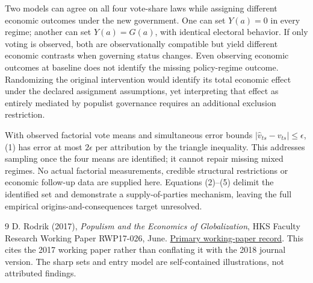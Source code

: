 \documentclass[11pt,a4paper]{article}
\begin{document}
Two models can agree on all four vote-share laws while assigning different economic outcomes under the new government. One can set $Y(a)=0$ in every regime; another can set $Y(a)=G(a)$, with identical electoral behavior. If only voting is observed, both are observationally compatible but yield different economic contrasts when governing status changes. Even observing economic outcomes at baseline does not identify the missing policy-regime outcome. Randomizing the original intervention would identify its total economic effect under the declared assignment assumptions, yet interpreting that effect as entirely mediated by populist governance requires an additional exclusion restriction.

With observed factorial vote means and simultaneous error bounds $|\widehat v_{ts}-v_{ts}|\le\epsilon$, (1) has error at most $2\epsilon$ per attribution by the triangle inequality. This addresses sampling once the four means are identified; it cannot repair missing mixed regimes. No actual factorial measurements, credible structural restrictions or economic follow-up data are supplied here. Equations (2)--(5) delimit the identified set and demonstrate a supply-of-parties mechanism, leaving the full empirical origins-and-consequences target unresolved.

\begin{thebibliography}{9}
 D. Rodrik (2017), \emph{Populism and the Economics of Globalization}, HKS Faculty Research Working Paper RWP17-026, June. \href{https://www.hks.harvard.edu/publications/populism-and-economics-globalization}{Primary working-paper record}. This cites the 2017 working paper rather than conflating it with the 2018 journal version. The sharp sets and entry model are self-contained illustrations, not attributed findings.
\end{thebibliography}
\end{document}

